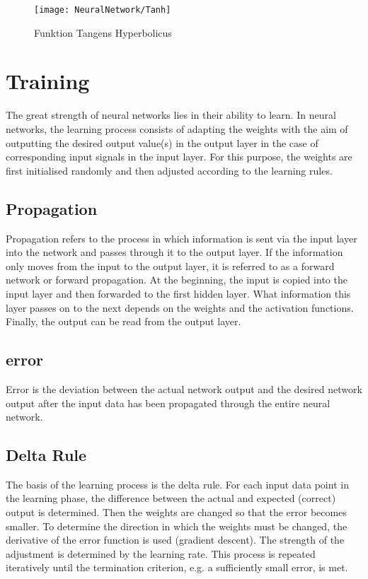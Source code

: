 \begin{figure}[H]
	\begin{center}
	\texttt{[image: NeuralNetwork/Tanh]}
	\caption{Funktion Tangens Hyperbolicus}\label{NNTanh}
	\end{center}
\end{figure}

	
	

\section{Training}%

The great strength of neural networks lies in their ability to learn. In neural networks, the learning process consists of adapting the weights with the aim of outputting the desired output value(s) in the output layer in the case of corresponding input signals in the input layer. For this purpose, the weights are first initialised randomly and then adjusted according to the learning rules.


\subsection{Propagation}

Propagation refers to the process in which information is sent via the input layer into the network and passes through it to the output layer. If the information only moves from the input to the output layer, it is referred to as a forward network or forward propagation. At the beginning, the input is copied into the input layer and then forwarded to the first hidden layer. What information this layer passes on to the next depends on the weights and the activation functions. Finally, the output can be read from the output layer. \cite{Kriesel:2008}


\subsection{error}

Error is the deviation between the actual network output and the desired network output after the input data has been propagated through the entire neural network. \cite{Kriesel:2008}


\subsection{Delta Rule} 
The basis of the learning process is the delta rule. For each input data point in the learning phase, the difference between the actual and expected (correct) output is determined. Then the weights are changed so that the error becomes smaller. To determine the direction in which the weights must be changed, the derivative of the error function is used (gradient descent). The strength of the adjustment is determined by the learning rate. This process is repeated iteratively until the termination criterion, e.g. a sufficiently small error, is met.\cite{Kononenko:2007}

